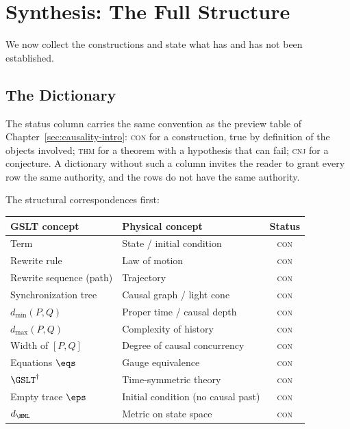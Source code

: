 \chapter{Synthesis: The Full Structure}
\label{sec:synthesis}

We now collect the constructions and state what has and has not been
established.

\section{The Dictionary}

The status column carries the same convention as the preview table of
Chapter~\ref{sec:causality-intro}: \textsc{con} for a construction, true by definition of the
objects involved; \textsc{thm} for a theorem with a hypothesis that can
fail; \textsc{cnj} for a conjecture.  A dictionary without such a column
invites the reader to grant every row the same authority, and the rows do
not have the same authority.

The structural correspondences first:

\begin{center}
\renewcommand{\arraystretch}{1.3}
\begin{tabular}{p{4.9cm} p{5.6cm} c}
\toprule
\textbf{GSLT concept} & \textbf{Physical concept} & \textbf{Status} \\
\midrule
Term & State / initial condition & \textsc{con} \\
Rewrite rule & Law of motion & \textsc{con} \\
Rewrite sequence (path) & Trajectory & \textsc{con} \\
Synchronization tree & Causal graph / light cone & \textsc{con} \\
$d_{\min}(P,Q)$ & Proper time / causal depth & \textsc{con} \\
$d_{\max}(P,Q)$ & Complexity of history & \textsc{con} \\
Width of $[P,Q]$ & Degree of causal concurrency & \textsc{con} \\
Equations $\eqs$ & Gauge equivalence & \textsc{con} \\
$\GSLT^\dagger$ & Time-symmetric theory & \textsc{con} \\
Empty trace $\eps$ & Initial condition (no causal past) & \textsc{con} \\
$d_{\HML}$ & Metric on state space & \textsc{con} \\
\bottomrule
\end{tabular}
\end{center}

